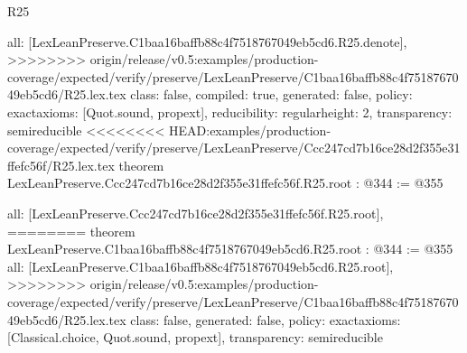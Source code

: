 \begin{lexlean}{R25}
\begin{coremodule}
{{{{{  all: [LexLeanPreserve.C1baa16baffb88c4f7518767049eb5cd6.R25.denote],
>>>>>>>> origin/release/v0.5:examples/production-coverage/expected/verify/preserve/LexLeanPreserve/C1baa16baffb88c4f7518767049eb5cd6/R25.lex.tex
  class: false,
  compiled: true,
  generated: false,
  policy: exact{axioms: [Quot.sound, propext]},
  reducibility: regular{height: 2},
  transparency: semireducible
}
<<<<<<<< HEAD:examples/production-coverage/expected/verify/preserve/LexLeanPreserve/Ccc247cd7b16ce28d2f355e31ffefc56f/R25.lex.tex
theorem LexLeanPreserve.Ccc247cd7b16ce28d2f355e31ffefc56f.R25.root : @344 := @355 {
  all: [LexLeanPreserve.Ccc247cd7b16ce28d2f355e31ffefc56f.R25.root],
========
theorem LexLeanPreserve.C1baa16baffb88c4f7518767049eb5cd6.R25.root : @344 := @355 {
  all: [LexLeanPreserve.C1baa16baffb88c4f7518767049eb5cd6.R25.root],
>>>>>>>> origin/release/v0.5:examples/production-coverage/expected/verify/preserve/LexLeanPreserve/C1baa16baffb88c4f7518767049eb5cd6/R25.lex.tex
  class: false,
  generated: false,
  policy: exact{axioms: [Classical.choice, Quot.sound, propext]},
  transparency: semireducible
}

}}}}}
\end{coremodule}
\end{lexlean}

